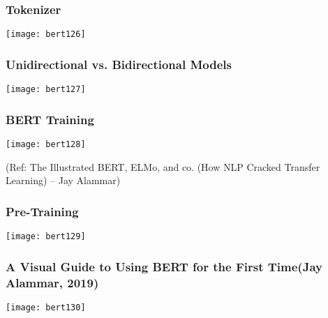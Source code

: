 \begin{frame}[fragile]\frametitle{Tokenizer}

			\begin{center}
			\texttt{[image: bert126]}
			\end{center}	

\end{frame}

\begin{frame}[fragile]\frametitle{ Unidirectional vs. Bidirectional Models}

			\begin{center}
			\texttt{[image: bert127]}
			\end{center}	

\end{frame}

\begin{frame}[fragile]\frametitle{ BERT Training}

			\begin{center}
			\texttt{[image: bert128]}
			\end{center}	

{\tiny (Ref: The Illustrated BERT, ELMo, and co. (How NLP Cracked Transfer Learning) – Jay Alammar)}

\end{frame}

\begin{frame}[fragile]\frametitle{Pre-Training}

			\begin{center}
			\texttt{[image: bert129]}
			\end{center}	


\end{frame}

\begin{frame}[fragile]\frametitle{A Visual Guide to Using BERT for the First Time(Jay Alammar, 2019)}

			\begin{center}
			\texttt{[image: bert130]}
			\end{center}	


\end{frame}

